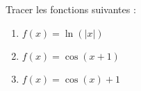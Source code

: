 
\begin{exercice}[\boringexo]\label{exorevisions-0003}

	Tracer les fonctions suivantes :
	\begin{enumerate}
		\item
			$f(x)=\ln(| x |)$
		\item
			$f(x)=\cos(x+1)$
		\item
			$f(x)=\cos(x)+1$
	\end{enumerate}

\end{exercice}
